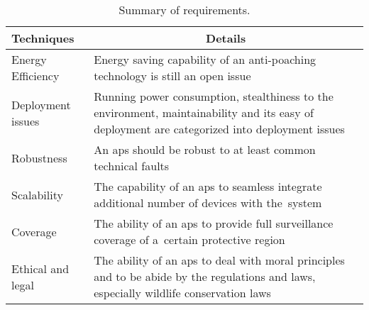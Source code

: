 \begin{table}[htbp]
	\centering
	\caption{Summary of requirements.}
	\label{tab:openissues}
		\begin{tabular}{@{}m{}m{}@{}}
			\toprule
			\centering\textbf{Techniques} & \multicolumn{1}{c}{\textbf{Details}}  \\ \midrule
			Energy Efficiency      & Energy saving capability of an anti-poaching technology is  still  an  open  issue  \\

			Deployment issues  & Running power consumption, stealthiness to the environment, maintainability and its easy of deployment are categorized into deployment issues\\
			Robustness  & {An} \acrfull{aps} should be robust to at least common technical faults\\
			Scalability & The capability of an \gls{aps} to seamless integrate additional number of devices with the~system \\
			Coverage   & The ability of an \gls{aps} to provide full surveillance coverage of a~certain protective region \\
			Ethical and legal &  The ability of an \gls{aps} to deal with moral principles and to be abide by the regulations and laws, especially wildlife conservation laws \\

			\bottomrule
		\end{tabular}
\end{table}